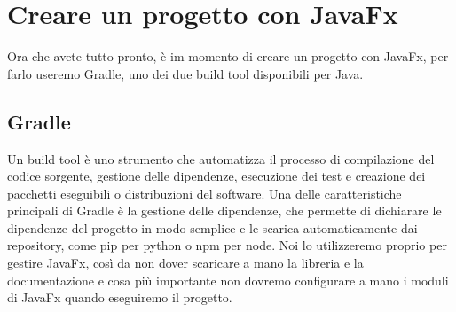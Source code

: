 \section{Creare un progetto con JavaFx}
    Ora che avete tutto pronto, è im momento di creare un progetto con JavaFx, per farlo useremo Gradle, uno dei due build tool disponibili per Java.
    
    \subsection{Gradle}
        Un build tool è uno strumento che automatizza il processo di compilazione del codice sorgente, gestione delle dipendenze, esecuzione dei 
        test e creazione dei pacchetti eseguibili o distribuzioni del software. Una delle caratteristiche principali di Gradle è la 
        gestione delle dipendenze, che permette di dichiarare le dipendenze del progetto in modo semplice e le scarica automaticamente dai repository, 
        come pip per python o npm per node. Noi lo utilizzeremo proprio per gestire JavaFx, così da non dover scaricare a mano la libreria e la documentazione
        e cosa più importante non dovremo configurare a mano i moduli di JavaFx quando eseguiremo il progetto.

